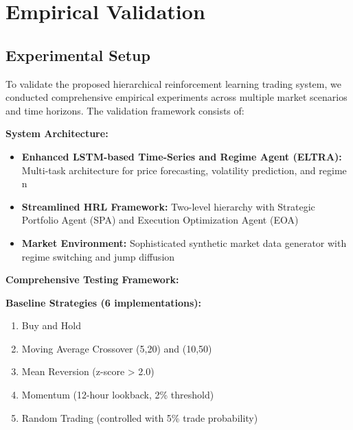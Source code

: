\documentclass[11pt]{article}
\begin{document}
\section{Empirical Validation}

\subsection{Experimental Setup}

To validate the proposed hierarchical reinforcement learning trading system, we conducted comprehensive empirical experiments across multiple market scenarios and time horizons. The validation framework consists of:

\textbf{System Architecture:}
\begin{itemize}
\item \textbf{Enhanced LSTM-based Time-Series and Regime Agent (ELTRA):} Multi-task architecture for price forecasting, volatility prediction, and regime n
\item \textbf{Streamlined HRL Framework:} Two-level hierarchy with Strategic Portfolio Agent (SPA) and Execution Optimization Agent (EOA)
\item \textbf{Market Environment:} Sophisticated synthetic market data generator with regime switching and jump diffusion

\end{itemize}
\textbf{Comprehensive Testing Framework:}
\textbf{Baseline Strategies (6 implementations):}
\begin{enumerate}
\item Buy and Hold
\item Moving Average Crossover (5,20) and (10,50)
\item Mean Reversion (z-score > 2.0)
\item Momentum (12-hour lookback, 2\% threshold)
\item Random Trading (controlled with 5\% trade probability)

\end{enumerate}
\end{document}
